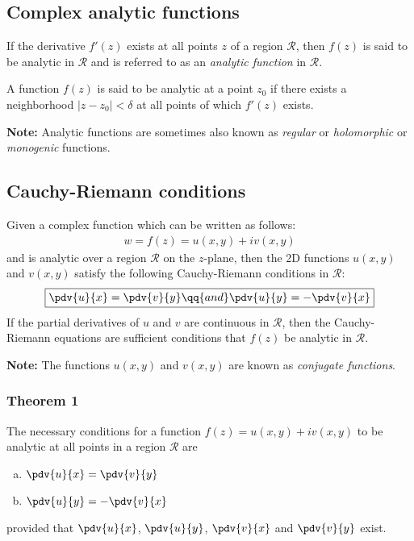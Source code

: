 	\subsection{Complex analytic functions}
		If the derivative $f'(z)$ exists at all points $z$ of a region $\mathcal{R}$, then $f(z)$ is said to be analytic in $\mathcal{R}$ and is referred to as an \textit{analytic function} in $\mathcal{R}$.
		
		A function $f(z)$ is said to be analytic at a point $z_0$ if there exists a neighborhood $|z - z_0| < \delta$ at all points
		of which $f'(z)$ exists.
		
		\textbf{Note:} Analytic functions are sometimes also known as \textit{regular} or \textit{holomorphic} or \textit{monogenic} functions.

	\subsection{Cauchy-Riemann conditions}
		Given a complex function which can be written as follows:
		\begin{align*}
			w=f(z)=u(x,y)+iv(x,y)
		\end{align*}
		and is analytic over a region $\mathcal{R}$ on the $z$-plane, then the 2D functions $u(x,y)$ and $v(x,y)$ satisfy the following Cauchy-Riemann conditions in $\mathcal{R}$:
		\begin{align*}
			\boxed{\pdv{u}{x}=\pdv{v}{y}\qq{and}\pdv{u}{y}=-\pdv{v}{x}}
		\end{align*}
		If the partial derivatives of $u$ and $v$ are continuous in $\mathcal{R}$, then the Cauchy-Riemann equations are sufficient
		conditions that $f(z)$ be analytic in $\mathcal{R}$.
		
		\textbf{Note:} The functions $u(x,y)$ and $v(x,y)$ are known as \textit{conjugate functions}.
		
		\subsubsection*{Theorem 1}
			The necessary conditions for a function $f(z)=u(x,y)+iv(x,y)$ to be analytic at all points in a region $\mathcal{R}$ are
			\begin{enumerate}[a)]
				\item $\pdv{u}{x}=\pdv{v}{y}$
				\item $\pdv{u}{y}=-\pdv{v}{x}$
			\end{enumerate}
			provided that $\pdv{u}{x}$, $\pdv{u}{y}$, $\pdv{v}{x}$ and $\pdv{v}{y}$ exist.
			

